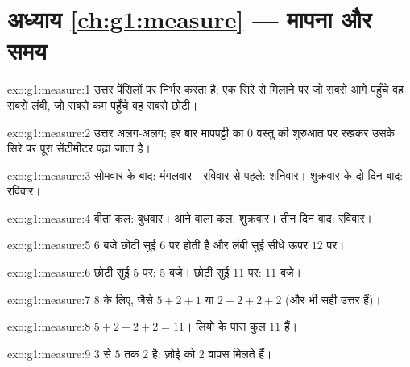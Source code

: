 \section*{अध्याय \ref{ch:g1:measure} --- मापना और समय}

\begin{solution}{exo:g1:measure:1}
उत्तर पेंसिलों पर निर्भर करता है; एक सिरे से मिलाने पर जो सबसे
आगे पहुँचे वह सबसे लंबी, जो सबसे कम पहुँचे वह सबसे छोटी।
\end{solution}

\begin{solution}{exo:g1:measure:2}
उत्तर अलग-अलग; हर बार मापपट्टी का $0$ वस्तु की शुरुआत पर रखकर
उसके सिरे पर पूरा सेंटीमीटर पढ़ा जाता है।
\end{solution}

\begin{solution}{exo:g1:measure:3}
सोमवार के बाद: मंगलवार। रविवार से पहले: शनिवार। शुक्रवार के दो
दिन बाद: रविवार।
\end{solution}

\begin{solution}{exo:g1:measure:4}
बीता कल: बुधवार। आने वाला कल: शुक्रवार। तीन दिन बाद: रविवार।
\end{solution}

\begin{solution}{exo:g1:measure:5}
$6$ बजे छोटी सुई $6$ पर होती है और लंबी सुई सीधे ऊपर
$12$ पर।
\end{solution}

\begin{solution}{exo:g1:measure:6}
छोटी सुई $5$ पर: $5$ बजे। छोटी सुई $11$ पर: $11$ बजे।
\end{solution}

\begin{solution}{exo:g1:measure:7}
$8$ के लिए, जैसे $5 + 2 + 1$ या $2 + 2 + 2 + 2$ (और भी सही
उत्तर हैं)।
\end{solution}

\begin{solution}{exo:g1:measure:8}
$5 + 2 + 2 + 2 = 11$। लियो के पास कुल $11$ हैं।
\end{solution}

\begin{solution}{exo:g1:measure:9}
$3$ से $5$ तक $2$ है: ज़ोई को $2$ वापस मिलते हैं।

\end{solution}
